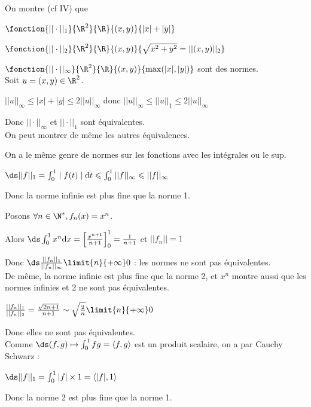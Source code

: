 \begin{exemple}
    On montre (cf IV) que 

    $\fonction{|| \cdot ||_1}{\R^2}{\R}{(x, y)}{|x| + |y|}$

    $\fonction{|| \cdot ||_2}{\R^2}{\R}{(x, y)}{\sqrt{x^2 + y^2} = ||(x, y)||_2}$

    $\fonction{|| \cdot ||_\infty}{\R^2}{\R}{(x, y)}{\max (|x|, |y|)}$
    sont des normes. \\

    Soit $u = (x, y) \in \R^2$. 

    $|| u ||_\infty \leqslant |x| + |y| \leqslant 2 ||u||_\infty$
    donc $|| u ||_\infty \leqslant ||u||_1 \leqslant 2 ||u||_\infty$

    Donc $|| \cdot ||_\infty$ et $|| \cdot ||_1$ sont équivalentes. \\

    On peut montrer de même les autres équivalences.
\end{exemple}

\begin{exemple}
    On a le même genre de normes sur les fonctions avec les intégrales ou le sup. 

    $\ds ||f||_1 = \int_{0}^{1} \mid f(t) \mid \text d t \leqslant \int_{0}^{1} ||f||_\infty \leqslant ||f ||_\infty$

    Donc la norme infinie est plus fine que la norme 1. 

    Posons $\forall n \in \N^*, f_n (x) = x^n$. 

    Alors $\ds \int_{0}^{1} x^n \text d x = \left[\frac {x^{n + 1}}{n+ 1}\right]_0^1 = \frac 1 {n + 1}$
    et $||f_n|| = 1$

    Donc $\ds \frac{||f_n||_1}{||f_n||_\infty} \limit{n}{+ \infty} 0$ : les normes ne sont pas équivalentes. \\

    De même, la norme infinie est plus fine que la norme 2, et $x^n$ montre aussi 
    que les normes infinies et 2 ne sont pas équivalentes.

    $\frac{||f_n||_1}{||f_n||_2} = \frac{\sqrt{2n + 1}}{n+1} \sim \sqrt{\frac 2 n} \limit{n}{+ \infty} 0$

    Donc elles ne sont pas équivalentes. \\

    Comme $\ds (f, g) \mapsto \int_{0}^{1}fg = \langle f, g \rangle$ est un produit scalaire, on 
    a par Cauchy Schwarz : 

    $\ds ||f||_1 = \int_{0}^{1} |f| \times 1 = \langle |f|, 1 \rangle$

        Donc la norme 2 est plus fine que la norme 1. 
\end{exemple}

